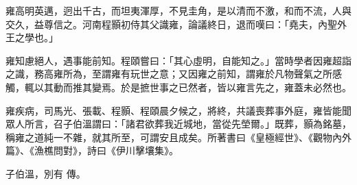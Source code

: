\begin{pinyinscope}
 雍高明英邁，迥出千古，而坦夷渾厚，不見圭角，是以清而不激，和而不流，人與交久，益尊信之。河南程顥初侍其父識雍，論議終日，退而嘆曰：「堯夫，內聖外王之學也。」



 雍知慮絕人，遇事能前知。程頤嘗曰：「其心虛明，自能知之。」當時學者因雍超詣之識，務高雍所為，至謂雍有玩世之意；又因雍之前知，謂雍於凡物聲氣之所感觸，輒以其動而推其變焉。於是摭世事之已然者，皆以雍言先之，雍蓋未必然也。



 雍疾病，司馬光、張載、程顥、程頤晨夕候之，將終，共議喪葬事外庭，雍皆能聞眾人所言，召子伯溫謂曰：「諸君欲葬我近城地，當從先塋爾。」既葬，顥為銘墓，稱雍之道純一不雜，就其所至，可謂安且成矣。所著書曰《皇極經世》、《觀物內外篇》、《漁樵問對》，詩曰《伊川擊壤集》。



 子伯溫，別有
 傳。



\end{pinyinscope}